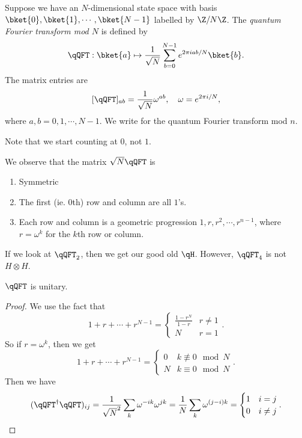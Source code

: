 \documentclass[a4paper]{article}
\begin{document}
\begin{defi}
  Suppose we have an $N$-dimensional state space with basis $\bket{0}, \bket{1}, \cdots, \bket{N - 1}$ labelled by $\Z/N\Z$. The \emph{quantum Fourier transform mod $N$} is defined by
  \[
    \qQFT: \bket{a} \mapsto \frac{1}{\sqrt{N}} \sum_{b = 0}^{N - 1} e^{2\pi i ab/N} \bket{b}.
  \]
  The matrix entries are
  \[
    [\qQFT]_{ab} = \frac{1}{\sqrt{N}} \omega^{ab},\quad \omega = e^{2\pi i/N},
  \]
  where $a, b = 0, 1, \cdots, N - 1$. We write  for the quantum Fourier transform mod $n$.
\end{defi}
Note that we start counting at $0$, not $1$.

We observe that the matrix $\sqrt{N}\qQFT$ is
\begin{enumerate}
  \item Symmetric
  \item The first (ie. $0$th) row and column are all $1$'s.
  \item Each row and column is a geometric progression $1, r, r^2, \cdots, r^{n - 1}$, where $r = \omega^k$ for the $k$th row or column.
\end{enumerate}

\begin{eg}
  If we look at $\qQFT_2$, then we get our good old $\qH$. However, $\qQFT_4$ is not $H \otimes H$.
\end{eg}

\begin{prop}
  $\qQFT$ is unitary.
\end{prop}

\begin{proof}
  We use the fact that
  \[
    1 + r + \cdots + r^{N - 1} =
    \begin{cases}
      \frac{1 - r^N}{1 - r} & r \not= 1\\
      N & r = 1
    \end{cases}.
  \]
  So if $r = \omega^k$, then we get
  \[
    1 + r + \cdots + r^{N - 1} =
    \begin{cases}
      0 & k \not\equiv 0 \mod N\\
      N & k \equiv 0 \mod N
    \end{cases}.
  \]
  Then we have
  \[
    (\qQFT^\dagger \qQFT)_{ij} = \frac{1}{\sqrt{N}^2} \sum_k \omega^{-ik} \omega^{jk} =\frac{1}{N} \sum_k \omega^{(j-i)k} =
    \begin{cases}
      1 & i = j\\
      0 & i \not= j
    \end{cases}.
  \]
\end{proof}
\end{document}

